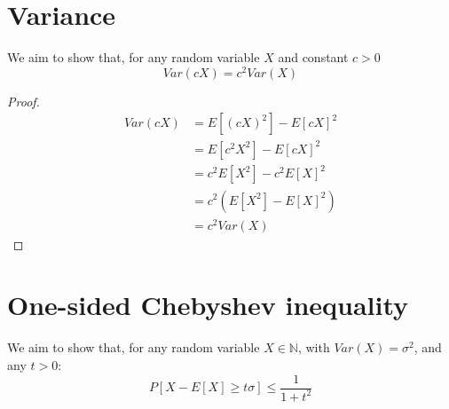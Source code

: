 \documentclass[a4paper]{scrreprt}
\begin{document}
\section{Variance}

We aim to show that, for any random variable $X$ and constant $c > 0$
\[
	Var(cX) = c^2 Var(X)
\]
	
\begin{proof}

	\begin{align*}
		Var(cX) & = E[(cX)^2] - E[cX]^2 \\
			& = E[c^2 X^2] - E[cX]^2 \\
			& = c^2 E[X^2] - c^2 E[X]^2 \\
			& = c^2 (E[X^2] - E[X]^2) \\
			& = c^2 Var(X)
	\end{align*}
\end{proof}

\section{One-sided Chebyshev inequality}

We aim to show that, for any random variable $X \in \mathbb{N}$, with $Var(X) = \sigma^2$, and any $t > 0$:
\[
	P[X - E[X] \geq t \sigma] \leq \frac{1}{1 + t^2}
\]
\end{document}
